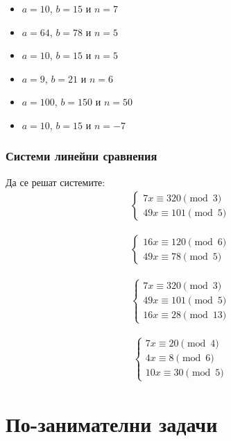\documentclass[12pt]{article}
\begin{document}
\begin{itemize}
    \item \(a = 10\), \(b = 15\) и \(n = 7\)
    \item \(a = 64\), \(b = 78\) и \(n = 5\)
    \item \(a = 10\), \(b = 15\) и \(n = 5\)
    \item \(a = 9\), \(b = 21\) и \(n = 6\)
    \item \(a = 100\), \(b = 150\) и \(n = 50\)
    \item \(a = 10\), \(b = 15\) и \(n = -7\)
\end{itemize}

\subsubsection*{Системи линейни сравнения}

Да се решат системите:
\begin{align*}
    \begin{cases}
        7x \equiv 320 \pmod{3} \\
        49x \equiv 101 \pmod{5}
    \end{cases}
\end{align*}

\begin{align*}
    \begin{cases}
        16x \equiv 120 \pmod{6} \\
        49x \equiv 78 \pmod{5}
    \end{cases}
\end{align*}

\begin{align*}
    \begin{cases}
        7x \equiv 320 \pmod{3} \\
        49x \equiv 101 \pmod{5} \\
        16x \equiv 28 \pmod{13}
    \end{cases}
\end{align*}

\begin{align*}
    \begin{cases}
        7x \equiv 20 \pmod{4} \\
        4x \equiv 8 \pmod{6} \\
        10x \equiv 30 \pmod{5}
    \end{cases}
\end{align*}

\section*{По-занимателни задачи}
\end{document}
